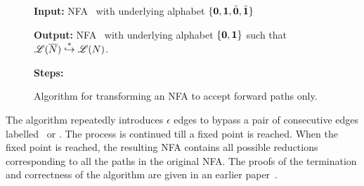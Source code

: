 \documentclass[9pt]{sigplanconf}
\begin{document}
\begin{enumerate}
\begin{figure*}[t]
\begin{boxedminipage}{\textwidth}
\begin{center}
  \raggedright  {\bf  Input:}  NFA \ntbar\  with  underlying
  alphabet $\lbrace \mathbf{0}, \mathbf{1}, \bar{\mathbf{0}}, \bar{\mathbf{1}}\rbrace$ \\
%
  \raggedright{\bf Output:} NFA  \nt\ with  underlying
  alphabet $\lbrace \mathbf{0}, \mathbf{1} \rbrace$ such that
  $\mathscr{L}({\overline{N}}) \stackrel{*}{\hookrightarrow} \mathscr{L}({N})$.
  \\
%  
  
  \raggedright{\bf Steps:}


   

   
\end{center}
\end{boxedminipage}
 \caption{Algorithm for transforming an NFA to  accept forward
   paths only.}\label{algo:simplify-NFA} \figrule
\end{figure*}

The algorithm repeatedly introduces  $\epsilon$ edges to bypass a
pair of consecutive edges labelled \bcar\acar\ or \bcdr\acdr.  The
process is  continued till  a fixed point  is reached.   When the
fixed point  is reached, the resulting NFA  contains all possible
reductions corresponding  to all the  paths in the  original NFA.
The proofs  of the termination  and correctness of  the algorithm
are given in an earlier paper~\cite{karkare07liveness}.


\end{enumerate}
\end{document}
